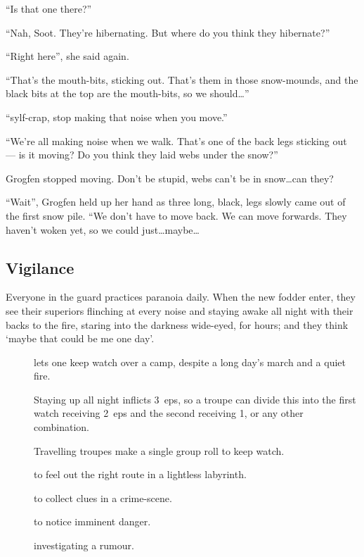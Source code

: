 \begin{multicols}{2}
\begin{exampletext}
  ``Is that one there?''

  ``Nah, Soot.
  They're hibernating.
  But where do you think they hibernate?''

  ``Right here'', she said again.
  {\small
    ``That's the mouth-bits, sticking out.
    That's them in those snow-mounds, and the black bits at the top are the mouth-bits, so we should\ldots''

    ``\Gls{sylf}-crap, stop making that noise when you move.''
  }{\footnotesize
    ``We're all making noise when we walk.
    That's one of the back legs sticking out --- is it moving?
    Do you think they laid webs under the snow?''

    Grogfen stopped moving.
    Don't be stupid, webs can't be in snow\ldots can they?
  }{\scriptsize
    ``Wait'',
    Grogfen held up her hand as three long, black, legs slowly came out of the first snow pile.
    ``We don't have to move back.
    We can move forwards.
    They haven't woken yet, so we could just\ldots maybe\ldots
  }

\end{exampletext}

\subsection{Vigilance}

Everyone in the \gls{guard} practices paranoia daily.
When the new fodder enter, they see their superiors flinching at every noise and staying awake all night with their backs to the fire, staring into the darkness wide-eyed, for hours; and they think `maybe that could be me one day'.

\begin{description}
  \item[]
    lets one keep watch over a camp, despite a long day's march and a quiet fire.

    Staying up all night inflicts 3~\glspl{ep}, so a troupe can divide this into the first watch receiving 2~\glspl{ep} and the second receiving 1, or any other combination.

    Travelling troupes make a single group roll to keep watch.

  \item[]
    to feel out the right route in a lightless labyrinth.
  \item[]
    to collect clues in a crime-scene.
  \item[]
    to notice imminent danger.
  \item[]
    investigating a rumour.
\end{description}


\end{multicols}
